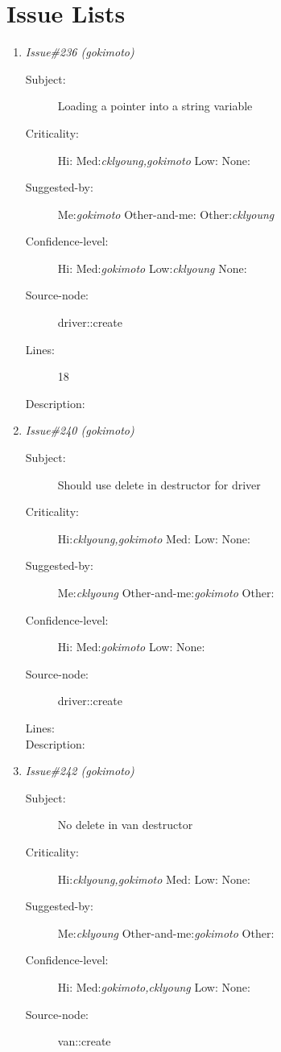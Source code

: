 \section{Issue Lists}
\begin{enumerate}
\item {\it Issue\#236 (gokimoto)}
\begin{description}
\item [Subject:] Loading a pointer into a string variable
\item [Criticality:] Hi:{\it } Med:{\it cklyoung,gokimoto} Low:{\it } None:{\it }
\item [Suggested-by:] Me:{\it gokimoto} Other-and-me:{\it } Other:{\it cklyoung}
\item [Confidence-level:] Hi:{\it } Med:{\it gokimoto} Low:{\it cklyoung} None:{\it }
\item [Source-node:] driver::create

\item [Lines:] 18

\item [Description:] 
\end{description}
\item {\it Issue\#240 (gokimoto)}
\begin{description}
\item [Subject:] Should use delete in destructor for driver
\item [Criticality:] Hi:{\it cklyoung,gokimoto} Med:{\it } Low:{\it } None:{\it }
\item [Suggested-by:] Me:{\it cklyoung} Other-and-me:{\it gokimoto} Other:{\it }
\item [Confidence-level:] Hi:{\it } Med:{\it gokimoto} Low:{\it } None:{\it }
\item [Source-node:] driver::create

\item [Lines:] 

\item [Description:] 
\end{description}
\item {\it Issue\#242 (gokimoto)}
\begin{description}
\item [Subject:] No delete in van destructor
\item [Criticality:] Hi:{\it cklyoung,gokimoto} Med:{\it } Low:{\it } None:{\it }
\item [Suggested-by:] Me:{\it cklyoung} Other-and-me:{\it gokimoto} Other:{\it }
\item [Confidence-level:] Hi:{\it } Med:{\it gokimoto,cklyoung} Low:{\it } None:{\it }
\item [Source-node:] van::create


\end{description}
\end{enumerate}
